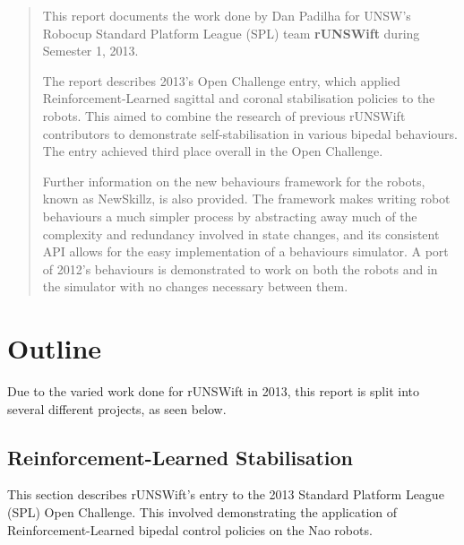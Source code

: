 \documentclass[pdftex,11pt,a4paper]{report}
\begin{document}
\newpage
\begin{abstract}
This report documents the work done by Dan Padilha for UNSW's Robocup Standard Platform League (SPL) team \textbf{rUNSWift} during Semester 1, 2013.

The report describes 2013's Open Challenge entry, which applied Reinforcement-Learned sagittal and coronal stabilisation policies to the robots. This aimed to combine the research of previous rUNSWift contributors to demonstrate self-stabilisation in various bipedal behaviours. The entry achieved third place overall in the Open Challenge.

Further information on the new behaviours framework for the robots, known as NewSkillz, is also provided. The framework makes writing robot behaviours a much simpler process by abstracting away much of the complexity and redundancy involved in state changes, and its consistent API allows for the easy implementation of a behaviours simulator. A port of 2012's behaviours is demonstrated to work on both the robots and in the simulator with no changes necessary between them.

\end{abstract}

\newpage
\setcounter{tocdepth}{2} %
\tableofcontents
\newpage
{}
\hypersetup{pageanchor=true}

\chapter{Outline}
Due to the varied work done for rUNSWift in 2013, this report is split into several different projects, as seen below.

\section{Reinforcement-Learned Stabilisation}
This section describes rUNSWift's entry to the 2013 Standard Platform League (SPL) Open Challenge. This involved demonstrating the application of Reinforcement-Learned bipedal control policies on the Nao robots.
\end{document}
